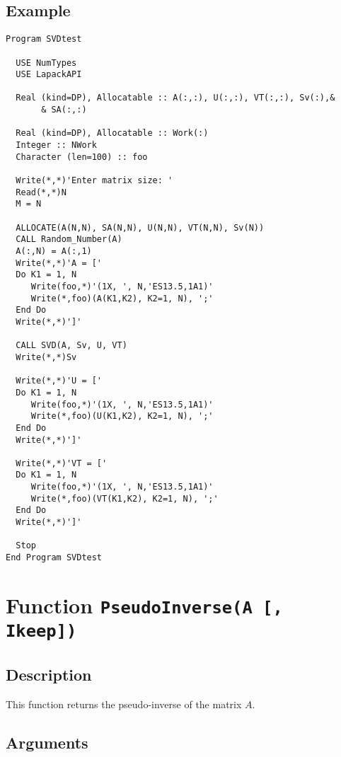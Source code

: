 \subsection{Example}

\begin{lstlisting}[emph=SVD,
                   emphstyle=\color{blue},
                   frame=trBL,
                   caption=Using lapack library to perform a SVD decomposition.,
                   label=svd]
Program SVDtest

  USE NumTypes
  USE LapackAPI

  Real (kind=DP), Allocatable :: A(:,:), U(:,:), VT(:,:), Sv(:),&
       & SA(:,:)

  Real (kind=DP), Allocatable :: Work(:)
  Integer :: NWork
  Character (len=100) :: foo

  Write(*,*)'Enter matrix size: '
  Read(*,*)N
  M = N

  ALLOCATE(A(N,N), SA(N,N), U(N,N), VT(N,N), Sv(N))
  CALL Random_Number(A)
  A(:,N) = A(:,1)
  Write(*,*)'A = ['
  Do K1 = 1, N
     Write(foo,*)'(1X, ', N,'ES13.5,1A1)'
     Write(*,foo)(A(K1,K2), K2=1, N), ';'
  End Do
  Write(*,*)']'

  CALL SVD(A, Sv, U, VT)
  Write(*,*)Sv

  Write(*,*)'U = ['
  Do K1 = 1, N
     Write(foo,*)'(1X, ', N,'ES13.5,1A1)'
     Write(*,foo)(U(K1,K2), K2=1, N), ';'
  End Do
  Write(*,*)']'

  Write(*,*)'VT = ['
  Do K1 = 1, N
     Write(foo,*)'(1X, ', N,'ES13.5,1A1)'
     Write(*,foo)(VT(K1,K2), K2=1, N), ';'
  End Do
  Write(*,*)']'

  Stop
End Program SVDtest
\end{lstlisting}

\section{Function \texttt{PseudoInverse(A [, Ikeep])}}

\subsection{Description}

This function returns the pseudo-inverse of the matrix $A$.

\subsection{Arguments}

